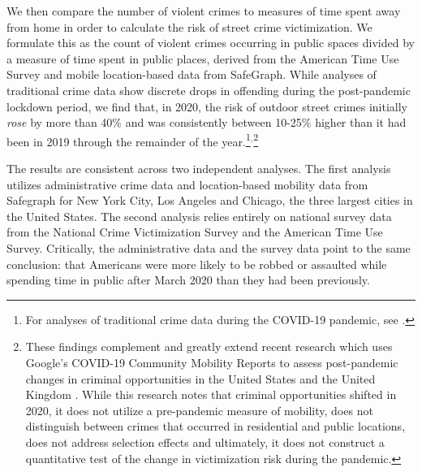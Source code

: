 \documentclass[12pt]{article}
\begin{document}
We then compare the number of violent crimes to measures of time spent away from home in order to calculate the risk of street crime victimization. We formulate this as the count of violent crimes occurring in public spaces divided by a measure of time spent in public places, derived from the American Time Use Survey and mobile location-based data from SafeGraph. While analyses of traditional crime data show discrete drops in offending during the post-pandemic lockdown period, we find that, in 2020, the risk of outdoor street crimes initially \emph{rose} by more than 40\% and was consistently between 10-25\% higher than it had been in 2019 through the remainder of the year.\footnote{For analyses of traditional crime data during the COVID-19 pandemic, see \citet{ashby2020initial, boman2020has, gerell2020minor, hodgkinson2020show, langton2021six, payne2020covid, piquero2020staying, shayegh2020staying, abrams2021covid, boman2021global, campedelli2021exploring, de2021druglords, nivette2021global}.}$^{,}$\footnote{These findings complement and greatly extend recent research which uses Google's COVID-19 Community Mobility Reports to assess post-pandemic changes in criminal opportunities in the United States \citep{lopez2021crime} and the United Kingdom \citep{halford2020crime}. While this research notes that criminal opportunities shifted in 2020, it does not utilize a pre-pandemic measure of mobility, does not distinguish between crimes that occurred in residential and public locations, does not address selection effects and ultimately, it does not construct a quantitative test of the change in victimization risk during the pandemic.}

The results are consistent across two independent analyses. The first analysis utilizes administrative crime data and location-based mobility data from Safegraph for New York City, Los Angeles and Chicago, the three largest cities in the United States. The second analysis relies entirely on national survey data from the National Crime Victimization Survey and the American Time Use Survey. Critically, the administrative data and the survey data point to the same conclusion: that Americans were more likely to be robbed or assaulted while spending time in public after March 2020 than they had been previously. 

\end{document}
